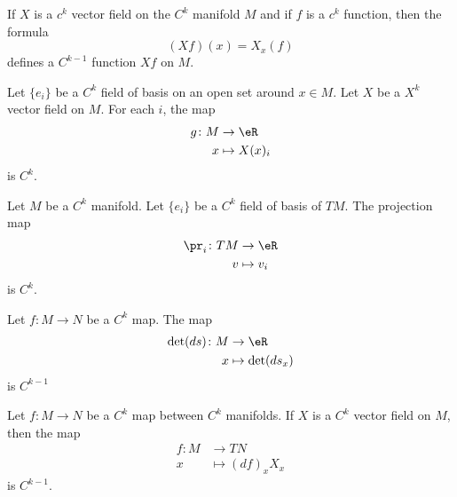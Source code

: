 \begin{lemma}       \label{LEMooPSWEooVKLWMQ}
	If \( X\) is a \( c^k\) vector field on the \( C^k\) manifold \( M\) and if \( f\) is a \( c^k\) function, then the formula
	\begin{equation}
		(Xf)(x)=X_x(f)
	\end{equation}
	defines a \( C^{k-1}\) function \( Xf\) on \( M\).
\end{lemma}
\noproof

\begin{proposition}		\label{PROPooVZNUooVoyFnx}
	Let \( \{ e_i \}\) be a \( C^k\) field of basis on an open set around \( x\in M\). Let \( X\) be a \( X^k\) vector field on \( M\). For each \( i\), the map
	\begin{equation}
		\begin{aligned}
			g\colon M & \to \eR        \\
			x         & \mapsto X(x)_i
		\end{aligned}
	\end{equation}
	is \( C^k\).
\end{proposition}
\noproof

\begin{proposition}		\label{PROPooLAQTooRHYmqy}
	Let \( M\) be a \( C^k\) manifold. Let \( \{ e_i \}\) be a \( C^k\) field of basis of \( TM\). The projection map
	\begin{equation}
		\begin{aligned}
			\pr_i\colon TM & \to \eR     \\
			v              & \mapsto v_i
		\end{aligned}
	\end{equation}
	is \( C^k\).
\end{proposition}

\noproof

\begin{proposition}		\label{PROPooYPLLooZaQEMx}
	Let \(f \colon M\to N  \) be a \( C^k\) map. The map
	\begin{equation}
		\begin{aligned}
			\det(ds)\colon M & \to \eR            \\
			x                & \mapsto \det(ds_x)
		\end{aligned}
	\end{equation}
	is \( C^{k-1}\)
\end{proposition}

\noproof

\begin{proposition}		\label{PROPooNTSLooCXQQXy}
	Let \(f \colon M\to N  \) be a \( C^k\) map between \( C^k\) manifolds. If \( X\) is a \( C^k\) vector field on \( M\), then the map
	\begin{equation}
		\begin{aligned}
			f\colon M & \to TN            \\
			x         & \mapsto (df)_xX_x
		\end{aligned}
	\end{equation}
	is \( C^{k-1}\).
\end{proposition}

